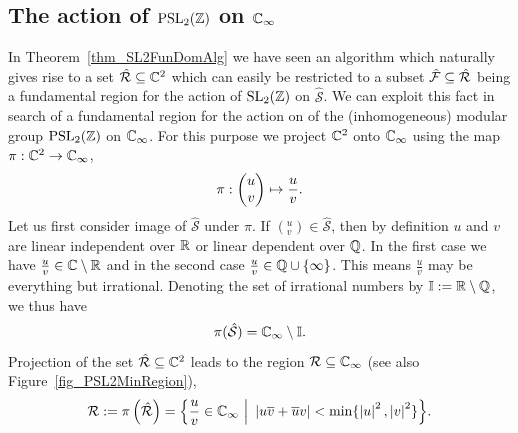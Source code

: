 \subsection{The action of $\operatorname{PSL}_{2}(\mathbb{Z})$ on $\mathbb{C}_{\infty}$}

In Theorem~\ref{thm_SL2FunDomAlg} we have seen an algorithm which naturally gives rise to a set $\hat{\mathcal{R}} \subseteq \mathbb{C}^2$ which can easily be restricted to a subset $\hat{\mathcal{F}} \subseteq \hat{\mathcal{R}}$ being a fundamental region for the action of $\operatorname{SL}_{2}(\mathbb{Z})$ on $\hat{\mathcal{S}}$. We can exploit this fact in search of a fundamental region for the action on of the (inhomogeneous) modular group $\operatorname{PSL}_{2}(\mathbb{Z})$ on $\mathbb{C}_{\infty}$. For this purpose we project $\mathbb{C}^2$ onto $\mathbb{C}_{\infty}$ using the map $\pi : \mathbb{C}^2 \to \mathbb{C}_{\infty}$,
\begin{equation}
\pi : \begin{pmatrix}u \\ v\end{pmatrix} \mapsto \frac{u}{v}.
\end{equation}
Let us first consider image of $\hat{\mathcal{S}}$ under $\pi$. If $({}^u_v) \in \hat{\mathcal{S}}$, then by definition $u$ and $v$ are linear independent over $\mathbb{R}$ or linear dependent over $\mathbb{Q}$. In the first case we have $\frac{u}{v} \in \mathbb{C} \setminus \mathbb{R}$ and in the second case $\frac{u}{v} \in \mathbb{Q} \cup \{\infty\}$. This means $\frac{u}{v}$ may be everything but irrational. Denoting the set of irrational numbers by $\mathbb{I} := \mathbb{R} \setminus \mathbb{Q}$, we thus have
\begin{equation*}
\pi(\hat{\mathcal{S}}) = \mathbb{C}_{\infty} \setminus \mathbb{I}.
\end{equation*}
Projection of the set $\hat{\mathcal{R}} \subseteq \mathbb{C}^2$ leads to the region $\mathcal{R} \subseteq \mathbb{C}_{\infty}$ (see also Figure~\ref{fig_PSL2MinRegion}),
\begin{equation}
\label{eqn_PSL2MinRegion}
\mathcal{R} := \pi\left(\hat{\mathcal{R}}\right) = 
\Big\{ \frac{u}{v} \in \mathbb{C}_{\infty} \ \Big| \ \left|u\overline{v} + \overline{u}v\right| < \min\{\left|u\right|^2, \left|v\right|^2\} \Big\}.
\end{equation}

